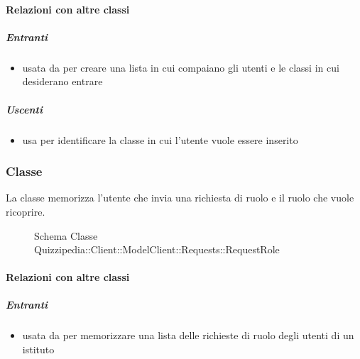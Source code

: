 \paragraph{Relazioni con altre classi}
\subparagraph{Entranti}
\begin{itemize}
\item usata da  per creare una lista in cui compaiano gli utenti e le classi in cui desiderano entrare
\end{itemize}
\subparagraph{Uscenti}
\begin{itemize}
\item usa  per identificare la classe
in cui l'utente vuole essere inserito
\end{itemize}
\subsubsection{Classe }
La classe memorizza l'utente che invia una richiesta di ruolo e il ruolo che vuole ricoprire.
\begin{figure}[H]
\centering
\noindent{}
\caption[Schema Classe RequestRole]{Schema Classe Quizzipedia::Client::ModelClient::Requests::RequestRole}
\end{figure}
\paragraph{Relazioni con altre classi}
\subparagraph{Entranti}
\begin{itemize}
\item usata da  per memorizzare una lista delle richieste di ruolo degli utenti di un istituto
\end{itemize}
